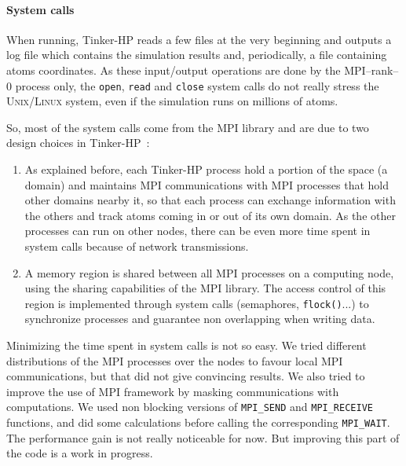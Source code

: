 \documentclass[9pt,comparison]{livecoms}
\newcommand{\lv}{\Large\verb}
\begin{document}
\paragraph{System calls}
\hspace{\parindent} When running, Tinker-HP reads a few files at the very beginning and outputs a log file which contains the simulation results and, periodically, a file containing atoms coordinates. As these input/output operations are done by the MPI--rank--0  process only,  the {\color{blue}\lv|open|}, {\color{blue}\lv|read|} and {\color{blue}\lv|close|}  system calls  do not really stress the \textsc{Unix/Linux} system, even if the simulation runs on millions of atoms.

 So, most of the system calls come from the \textsc{MPI} library and are due to two design choices in Tinker-HP~:
\begin{enumerate}
    \item As explained before, each Tinker-HP process hold a portion of the space (a domain) and maintains MPI communications with MPI processes that hold other domains nearby it, so that each process can exchange information  with the others and track atoms coming in or out of its own domain. As the other processes can run on other nodes, there can be even more time spent in system calls because of network transmissions. 
    \item A memory region is shared between all MPI processes on a computing node, using the sharing capabilities of the MPI library. The access control of this region is implemented through system calls (semaphores, {\color{codegreen}\lv|flock()|}...) to synchronize processes and guarantee non overlapping when writing data.
\end{enumerate}

Minimizing the time spent in system calls is not so easy. We tried different distributions of the MPI processes over the nodes to favour local MPI communications, but that did not give convincing results. We also tried to improve the use of MPI framework by masking communications with computations. We used non blocking versions of {\color{blue}\lv|MPI_SEND|} and {\color{blue}\lv|MPI_RECEIVE|} functions, and did some calculations before calling the corresponding {\color{blue}\lv|MPI_WAIT|}. The performance gain is not really noticeable for now. But improving this part of the code is a work in progress.
\end{document}
